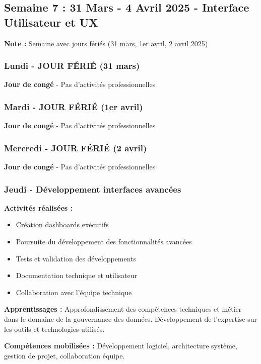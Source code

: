 \subsection{Semaine 7 : 31 Mars - 4 Avril 2025 - Interface Utilisateur et UX}

\textbf{Note :} Semaine avec jours fériés (31 mars, 1er avril, 2 avril 2025)

\subsubsection{Lundi - JOUR FÉRIÉ (31 mars)}

\textbf{Jour de congé} - Pas d'activités professionnelles

\subsubsection{Mardi - JOUR FÉRIÉ (1er avril)}

\textbf{Jour de congé} - Pas d'activités professionnelles

\subsubsection{Mercredi - JOUR FÉRIÉ (2 avril)}

\textbf{Jour de congé} - Pas d'activités professionnelles

\subsubsection{Jeudi - Développement interfaces avancées}

\textbf{Activités réalisées :}
\begin{itemize}
    \item Création dashboards exécutifs
    \item Poursuite du développement des fonctionnalités avancées
    \item Tests et validation des développements
    \item Documentation technique et utilisateur
    \item Collaboration avec l'équipe technique
\end{itemize}

\textbf{Apprentissages :}
Approfondissement des compétences techniques et métier dans le domaine de la gouvernance des données. Développement de l'expertise sur les outils et technologies utilisés.

\textbf{Compétences mobilisées :}
Développement logiciel, architecture système, gestion de projet, collaboration équipe.

